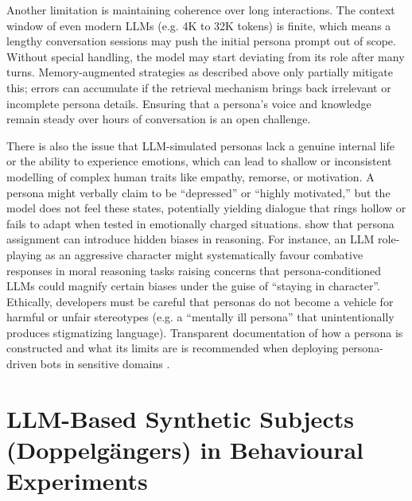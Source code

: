 Another limitation is maintaining coherence over long interactions. The context window of even modern LLMs (e.g. 4K to 32K tokens) is finite, which means a lengthy conversation sessions may push the initial persona prompt out of scope. Without special handling, the model may start deviating from its role after many turns. Memory-augmented strategies as described above only partially mitigate this; errors can accumulate if the retrieval mechanism brings back irrelevant or incomplete persona details. Ensuring that a persona's voice and knowledge remain steady over hours of conversation is an open challenge.

There is also the issue that LLM-simulated personas lack a genuine internal life or the ability to experience emotions, which can lead to shallow or inconsistent modelling of complex human traits like empathy, remorse, or motivation. A persona might verbally claim to be ``depressed'' or ``highly motivated,'' but the model does not feel these states, potentially yielding dialogue that rings hollow or fails to adapt when tested in emotionally charged situations. \cite{gupta-etal-2024-bias} show that persona assignment can introduce hidden biases in reasoning. For instance, an LLM role-playing as an aggressive character might systematically favour combative responses in moral reasoning tasks raising concerns that persona-conditioned LLMs could magnify certain biases under the guise of ``staying in character''. Ethically, developers must be careful that personas do not become a vehicle for harmful or unfair stereotypes (e.g. a “mentally ill persona” that unintentionally produces stigmatizing language). Transparent documentation of how a persona is constructed and what its limits are is recommended when deploying persona-driven bots in sensitive domains \cite{smith-etal-2020-mitigating}. 




\section{LLM-Based Synthetic Subjects (Doppelgängers) in Behavioural Experiments}
\label{sec:background_synthetic_validation}

